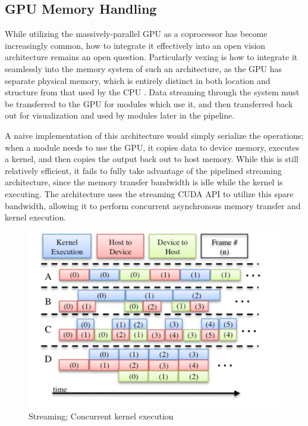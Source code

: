 \subsection{GPU Memory Handling}
While utilizing the massively-parallel GPU as a coprocessor has become increasingly common, how to integrate it effectively into an open vision architecture remains an open question. Particularly vexing is how to integrate it seamlessly into the memory system of such an architecture, as the GPU has separate physical memory, which is entirely distinct in both location and structure from that used by the CPU \cite{NVIDIA_Fermi}. Data streaming through the system must be transferred to the GPU for modules which use it, and then transferred back out for visualization and used by modules later in the pipeline.

A naive implementation of this architecture would simply serialize the operations; when a module needs to use the GPU, it copies data to device memory, executes a kernel, and then copies the output back out to host memory. While this is still relatively efficient, it fails to fully take advantage of the pipelined streaming architecture, since the memory transfer bandwidth is idle while the kernel is executing. The architecture uses the streaming CUDA API to utilize this spare bandwidth, allowing it to perform concurrent asynchronous memory transfer and kernel execution. 

\begin{figure}[t]
\begin{center}
\includegraphics[width=0.7\linewidth]{ConcurrentGPU.pdf}
\end{center}
   \caption{Streaming; Concurrent kernel execution}
\label{fig:Streaming}
\end{figure}

